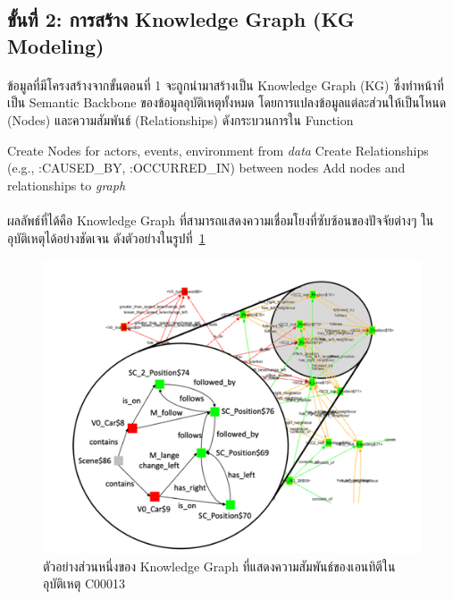 \subsection{ขั้นที่ 2: การสร้าง Knowledge Graph (KG Modeling)}\label{subsec:ch4_kg_modeling}

\paragraph{}
ข้อมูลที่มีโครงสร้างจากขั้นตอนที่ 1 จะถูกนำมาสร้างเป็น Knowledge Graph (KG) ซึ่งทำหน้าที่เป็น Semantic Backbone ของข้อมูลอุบัติเหตุทั้งหมด โดยการแปลงข้อมูลแต่ละส่วนให้เป็นโหนด (Nodes) และความสัมพันธ์ (Relationships) ดังกระบวนการใน Function 

\begin{algorithmic}[1]
    \State Create Nodes for actors, events, environment from \textit{data}
    \State Create Relationships (e.g., :CAUSED\_BY, :OCCURRED\_IN) between nodes
    \State Add nodes and relationships to \textit{graph}
\EndFunction
\end{algorithmic}

\paragraph{}
ผลลัพธ์ที่ได้คือ Knowledge Graph ที่สามารถแสดงความเชื่อมโยงที่ซับซ้อนของปัจจัยต่างๆ ในอุบัติเหตุได้อย่างชัดเจน ดังตัวอย่างในรูปที่~\ref{fig:ch4_kg_model}

\begin{figure}[htbp]
    \centering
    \includegraphics[width=1\textwidth]{images/kg-model-example}
    \caption{ตัวอย่างส่วนหนึ่งของ Knowledge Graph ที่แสดงความสัมพันธ์ของเอนทิตีในอุบัติเหตุ C00013}
    \label{fig:ch4_kg_model}
\end{figure}


